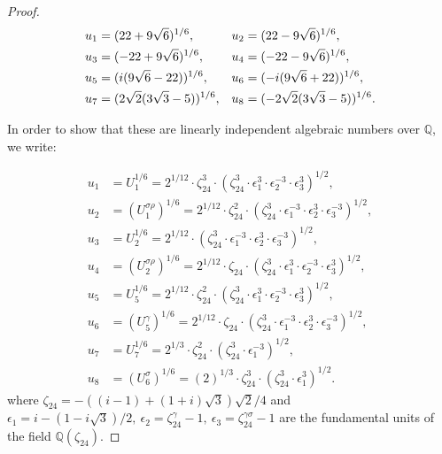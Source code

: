 \documentclass[11pt]{amsart}
\newcommand{\Q}{{\mathbb Q}}
\numberwithin{equation}{section}
\numberwithin{table}{section}
\newcommand\<{\langle}
\begin{document}
\begin{proof}
	\begin{align}
	u_1 & = (22+9 \sqrt{6})^{1/6},&
	u_2 & =   (22-9 \sqrt{6})^{1/6}, \notag \\
	u_3 & =   (-22+9 \sqrt{6})^{1/6}, & 
	u_4 & =   (-22-9 \sqrt{6})^{1/6}, \notag \\
	u_5 & =   (i(9 \sqrt{6}-22))^{1/6}, &
	u_6  &=   (-i(9 \sqrt{6}+22))^{1/6}, \notag \\
	u_7 & = (2 \sqrt{2}(3 \sqrt{3}-5))^{1/6}, &
	u_8 & = (-2 \sqrt{2}(3 \sqrt{3}-5))^{1/6}.\label{U-(1,4)}
\end{align} 

In order to show that these are linearly independent algebraic  numbers over $\Q$, we write:
	
	{\small	\begin{align*}
			u_1 & = U_1^{1/6}=2^{1/12}\cdot \zeta_{24}^3 \cdot \left( \zeta_{24}^3 \cdot \epsilon_1^3 \cdot  \epsilon_2^{-3} \cdot  \epsilon_3^{3}\right)^{1/2}, \\
			u_2 &= (U_1^{\sigma \rho})^{1/6}=2^{1/12}\cdot \zeta_{24}^2 \cdot \left( \zeta_{24}^3 \cdot \epsilon_1^{-3} \cdot  \epsilon_2^{3} \cdot  \epsilon_3^{-3}\right)^{1/2}, \\
			u_3 &= U_2^{1/6}=2^{1/12} \cdot \left( \zeta_{24}^3 \cdot \epsilon_1^{-3} \cdot  \epsilon_2^{3} \cdot  \epsilon_3^{-3}\right)^{1/2}, \\
			u_4 &= (U_2^{\sigma \rho})^{1/6}=2^{1/12}\cdot \zeta_{24} \cdot \left( \zeta_{24}^3 \cdot \epsilon_1^{3} \cdot  \epsilon_2^{-3} \cdot  \epsilon_3^{3}\right)^{1/2}, \\
			u_5 & = U_5^{1/6}=2^{1/12}\cdot \zeta_{24}^2 \cdot \left( \zeta_{24}^3 \cdot \epsilon_1^{3} \cdot  \epsilon_2^{-3} \cdot  \epsilon_3^{3}\right)^{1/2}, \\ 
			u_6 &= (U_5^{ \gamma})^{1/6}=2^{1/12} \cdot \zeta_{24} \cdot \left( \zeta_{24}^3 \cdot \epsilon_1^{-3} \cdot  \epsilon_2^{3} \cdot  \epsilon_3^{-3}\right)^{1/2}, \\
			u_7 &= U_7^{1/6}=2^{1/3}\cdot \zeta_{24}^2 \cdot ( \zeta_{24}^3 \cdot \epsilon_1^{-3})^{1/2}, \\
			u_8 &= (U_6^{\sigma})^{1/6}=(2)^{1/3}\cdot \zeta_{24}^3 \cdot ( \zeta_{24}^3 \cdot \epsilon_1^{3})^{1/2}. 
	\end{align*}}	
	where $ \zeta_{24}= - ((i-1)+(1+i)\sqrt{3})\sqrt{2}/4$ and 
	$\epsilon_1=i-(1- i \sqrt{3})/2, \ \epsilon_2= \zeta_{24}^\gamma -1, \ \epsilon_3=\zeta_{24}^{\gamma \sigma}-1$
	are the fundamental units of the field $\Q(\zeta_{24})$.

\end{proof}
\end{document}
